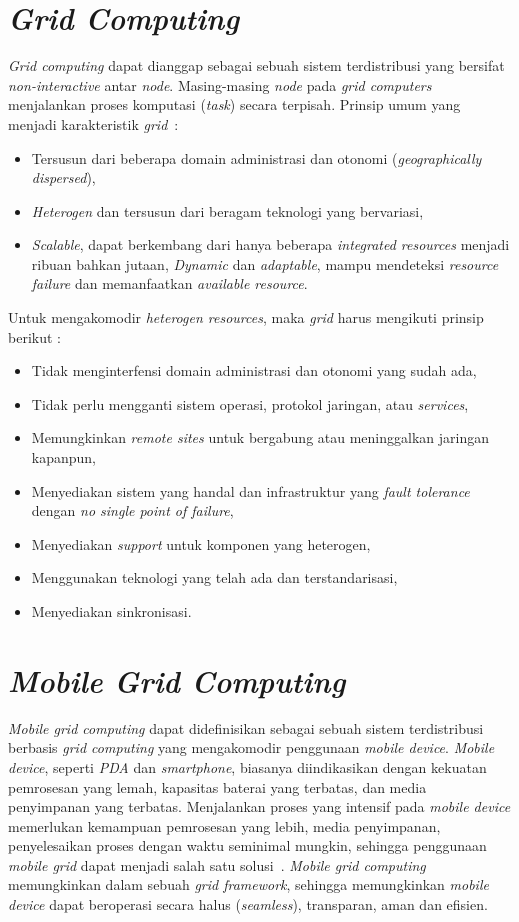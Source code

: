 \section{\textit{Grid Computing}}
\textit{Grid computing} dapat dianggap sebagai sebuah sistem terdistribusi yang bersifat \textit{non-interactive} antar \textit{node}. Masing-masing \textit{node} pada \textit{grid computers} menjalankan proses komputasi (\textit{task}) secara terpisah. Prinsip umum yang menjadi karakteristik \textit{grid}~\cite{baker_grids_2002}:
\begin{itemize}
\item Tersusun dari beberapa domain administrasi dan otonomi (\textit{geographically dispersed}), 
\item \textit{Heterogen} dan tersusun dari beragam teknologi yang bervariasi, 
\item \textit{Scalable}, dapat berkembang dari hanya beberapa \textit{integrated resources} menjadi ribuan bahkan jutaan, \textit{Dynamic} dan \textit{adaptable}, mampu mendeteksi \textit{resource failure} dan memanfaatkan \textit{available resource}.
\end{itemize}
Untuk mengakomodir \textit{heterogen resources}, maka \textit{grid} harus mengikuti prinsip berikut :
\begin{itemize}
\item Tidak menginterfensi domain administrasi dan otonomi yang sudah ada, 
\item Tidak perlu mengganti sistem operasi, protokol jaringan, atau \textit{services}, 
\item Memungkinkan \textit{remote sites} untuk bergabung atau meninggalkan jaringan kapanpun, 
\item Menyediakan sistem yang handal dan infrastruktur yang \textit{fault tolerance} dengan \textit{no single point of failure}, 
\item Menyediakan \textit{support} untuk komponen yang heterogen, 
\item Menggunakan teknologi yang telah ada dan terstandarisasi, 
\item Menyediakan sinkronisasi.
\end{itemize}

\section{\textit{Mobile Grid Computing}}
\textit{Mobile grid computing} dapat didefinisikan sebagai sebuah sistem terdistribusi berbasis \textit{grid computing} yang mengakomodir penggunaan \textit{mobile device}. \textit{Mobile device}, seperti \textit{PDA} dan \textit{smartphone}, biasanya diindikasikan dengan kekuatan pemrosesan yang lemah, kapasitas baterai yang terbatas, dan media penyimpanan yang terbatas. Menjalankan proses yang intensif pada \textit{mobile device} memerlukan kemampuan pemrosesan yang lebih, media penyimpanan, penyelesaikan proses dengan waktu seminimal mungkin, sehingga penggunaan \textit{mobile grid} dapat menjadi salah satu solusi~\cite{sathyan_job_2009}. \textit{Mobile grid computing} memungkinkan  dalam sebuah \textit{grid framework}, sehingga memungkinkan \textit{mobile device} dapat beroperasi secara halus (\textit{seamless}), transparan, aman dan efisien.

